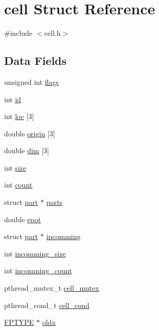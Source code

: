\hypertarget{structcell}{\section{cell Struct Reference}
\label{structcell}
}


{\ttfamily \#include $<$cell.\-h$>$}

\subsection*{Data Fields}
\begin{DoxyCompactItemize}
\item 
unsigned int \hyperlink{structcell_ac92588540e8c1d014a08cd8a45462b19}{flags}
\item 
int \hyperlink{structcell_a7441ef0865bcb3db9b8064dd7375c1ea}{id}
\item 
int \hyperlink{structcell_a4194dc8b8275d691bf74ce3d1e557319}{loc} \mbox{[}3\mbox{]}
\item 
double \hyperlink{structcell_a61c2e65573374fec6a4c402febbade84}{origin} \mbox{[}3\mbox{]}
\item 
double \hyperlink{structcell_ac45d92a78e958d1bdbce22331b752147}{dim} \mbox{[}3\mbox{]}
\item 
int \hyperlink{structcell_a439227feff9d7f55384e8780cfc2eb82}{size}
\item 
int \hyperlink{structcell_ad43c3812e6d13e0518d9f8b8f463ffcf}{count}
\item 
struct \hyperlink{structpart}{part} $\ast$ \hyperlink{structcell_a9de7180e861590a7c5ff24ae3eab56ed}{parts}
\item 
double \hyperlink{structcell_a3e050eccabbd5322482d7f63e45f038d}{epot}
\item 
struct \hyperlink{structpart}{part} $\ast$ \hyperlink{structcell_a83d896b2aea7ae521c86ae19cc314566}{incomming}
\item 
int \hyperlink{structcell_ac0d832e5fb07dce36e3b5abff5cb9018}{incomming\-\_\-size}
\item 
int \hyperlink{structcell_ad0204a1a62403fe53a05ad5e96899427}{incomming\-\_\-count}
\item 
pthread\-\_\-mutex\-\_\-t \hyperlink{structcell_aa508b7c8849aa057fc846870f7cf2f4d}{cell\-\_\-mutex}
\item 
pthread\-\_\-cond\-\_\-t \hyperlink{structcell_a31bb6a241fe11a2497848544f6721733}{cell\-\_\-cond}
\item 
\hyperlink{fptype_8h_a78f09a67f3e652a3b25e085a0082a835}{F\-P\-T\-Y\-P\-E} $\ast$ \hyperlink{structcell_a490ed72429c31324fe27c6deeb0f1346}{oldx}

\end{DoxyCompactItemize}
